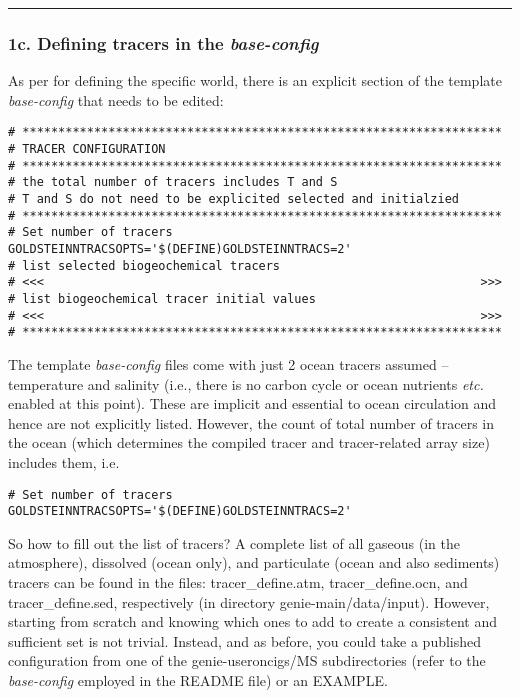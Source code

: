\documentclass[11pt,fleqn]{book} %
\begin{document}
%
\noindent\rule{4cm}{0.5pt}
\subsubsection{1c. Defining tracers in the \textit{base-config}}

As per for defining the specific world, there is an explicit section of the template \textit{base-config} that needs to be edited:

\footnotesize\vspace{-2pt}\begin{verbatim}
# *******************************************************************
# TRACER CONFIGURATION
# *******************************************************************
# the total number of tracers includes T and S
# T and S do not need to be explicited selected and initialzied
# *******************************************************************
# Set number of tracers
GOLDSTEINNTRACSOPTS='$(DEFINE)GOLDSTEINNTRACS=2'
# list selected biogeochemical tracers
# <<<                                                             >>>
# list biogeochemical tracer initial values
# <<<                                                             >>>
# *******************************************************************
\end{verbatim}\vspace{-2pt}\normalsize

The template \textit{base-config} files come with just 2 ocean tracers assumed -- temperature and salinity (i.e., there is no carbon cycle or ocean nutrients \textit{etc.} enabled at this point). These are implicit and essential to ocean circulation and hence are not explicitly listed. However, the count of total number of tracers in the ocean (which determines the compiled tracer and tracer-related array size) includes them, i.e.

\footnotesize\vspace{-2pt}\begin{verbatim}
# Set number of tracers
GOLDSTEINNTRACSOPTS='$(DEFINE)GOLDSTEINNTRACS=2'
\end{verbatim}\vspace{-2pt}\normalsize

So how to fill out the list of tracers? A complete list of all gaseous (in the atmosphere), dissolved (ocean only), and particulate (ocean and also sediments) tracers can be found in the files: \textsf{\footnotesize tracer\_define.atm}, \textsf{\footnotesize tracer\_define.ocn}, and \textsf{\footnotesize tracer\_define.sed}, respectively (in directory \textsf{\footnotesize genie-main/data/input}). However, starting from scratch and knowing which ones to add to create a consistent and sufficient set is not trivial. Instead, and as before, you could take a published configuration from one of the \textsf{\footnotesize genie-useroncigs/MS} subdirectories (refer to the \textit{base-config} employed in the README file) or an EXAMPLE.
\end{document}
